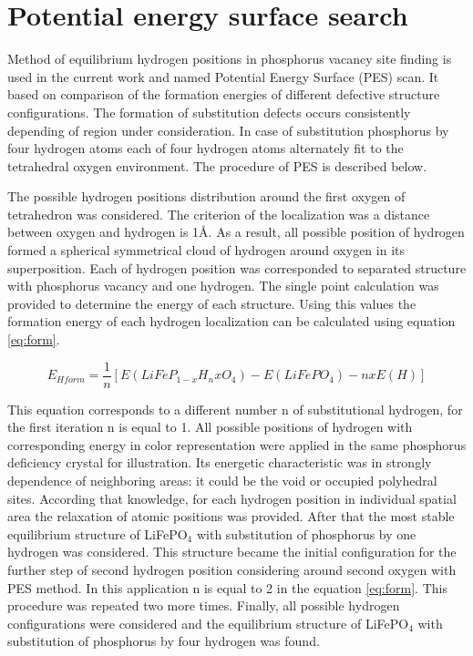 \section{Potential energy surface search}

Method of equilibrium hydrogen positions in phosphorus vacancy site finding is used in the current work and named Potential Energy Surface (PES) scan. It based on comparison of the formation energies of different defective structure configurations. The formation of substitution defects occurs consistently depending of region under consideration. In case of substitution phosphorus by four hydrogen atoms each of four hydrogen atoms alternately fit to the tetrahedral oxygen environment. The procedure of PES is described below.

The possible hydrogen positions distribution around the first oxygen of tetrahedron was considered. The criterion of the localization was a distance between oxygen and hydrogen is 1\AA. As a result, all possible position of hydrogen formed a spherical symmetrical cloud of hydrogen around oxygen in its superposition. Each of hydrogen position was corresponded to separated structure with phosphorus vacancy and one hydrogen. The single point calculation was provided to determine the energy of each structure. Using this values the formation energy of each hydrogen localization can be calculated using equation \ref{eq:form}.  

\begin{equation}
E_{Hform} = \frac{1}{n}[E(LiFeP_{1-x}H_nxO_4) - E(LiFePO_4) - nxE(H)]
\label{eq:form}
\end{equation}

This equation corresponds to a different number n of substitutional hydrogen, for the first iteration n is equal to 1. All possible positions of hydrogen with corresponding energy in color representation were applied in the same phosphorus deficiency crystal for illustration. Its energetic characteristic was in strongly dependence of neighboring areas: it could be the void or occupied polyhedral sites. According that knowledge, for each hydrogen position in individual spatial area the relaxation of atomic positions was provided. After that the most stable equilibrium structure of LiFePO$_4$ with substitution of phosphorus by one hydrogen was considered. This structure became the initial configuration for the further step of second hydrogen position considering around second oxygen with PES method. In this application n is equal to 2 in the equation \ref{eq:form}. This procedure was repeated two more times. Finally, all possible hydrogen configurations were considered and the equilibrium structure of LiFePO$_4$ with substitution of phosphorus by four hydrogen was found.